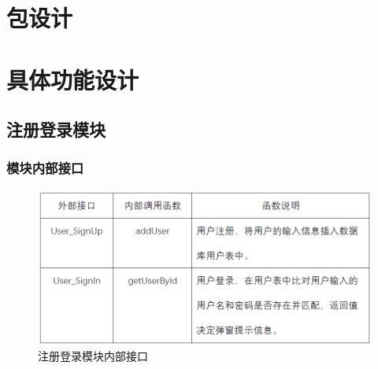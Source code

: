 \section{包设计}
\section{具体功能设计}
\subsection{注册登录模块}
\subsubsection{模块内部接口}
\begin{figure}[!htbp]
	\centering
	\includegraphics[scale=0.7]{image/b1.png} %
	\caption{注册登录模块内部接口} %
\end{figure}
